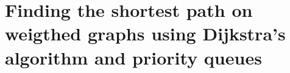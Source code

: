 
\chapter{Finding the shortest path on weigthed graphs using Dijkstra's algorithm and priority queues}

